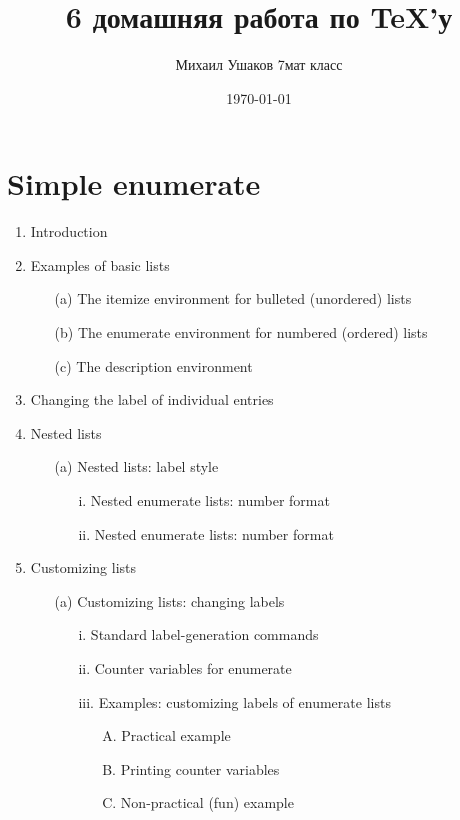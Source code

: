 \documentclass{article}
\title{6 домашняя работа по \TeX’у}
\author{Михаил Ушаков 7мат класс}
\date{\today}
\begin{document}
\maketitle
\tableofcontents
\vspace{11cm}
\section{Simple enumerate}

\begin{enumerate}
	\item Introduction
	\item Examples of basic lists
	\begin{itemize}
    	\item[(a)]The itemize environment for bulleted (unordered) lists
    	\item[(b)]The enumerate environment for numbered (ordered) lists
    	\item[(c)]The description environment
	\end{itemize}
	\item Changing the label of individual entries
	\item Nested lists
	\begin{itemize}
    	\item[(a)]Nested lists: label style
    	\begin{itemize}
        	\item[i.]Nested enumerate lists: number format
        	\item[ii.]Nested enumerate lists: number format
    	\end{itemize}
	\end{itemize}
	\item Customizing lists
	\begin{itemize}
    	\item[(a)]Customizing lists: changing labels
    	\begin{itemize}
        	\item[i.]Standard label-generation commands
        	\item[ii.]Counter variables for enumerate
        	\item[iii.]Examples: customizing labels of enumerate lists
        	\begin{itemize}
            	\item[A.]Practical example
            	\item[B.]Printing counter variables
            	\item[C.]Non-practical (fun) example

\end{itemize}
\end{itemize}
\end{itemize}
\end{enumerate}
\end{document}
